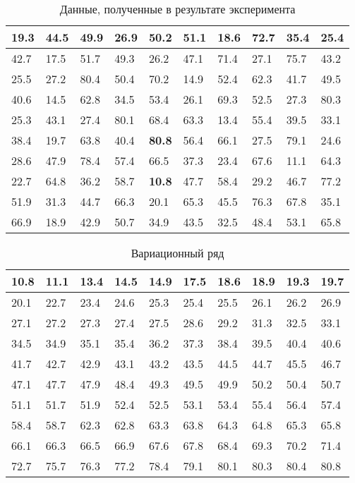 \documentclass{article}
\theoremstyle{problemstyle}
\begin{document}
\begin{table}[ht!]
  \centering
  \begin{tabular}{|l|l|l|l|l|l|l|l|l|l|}
    \hline
    19.3 & 44.5 & 49.9 & 26.9 & 50.2 & 51.1 & 18.6 & 72.7 & 35.4 & 25.4 \\
    \hline
    42.7 & 17.5 & 51.7 & 49.3 & 26.2 & 47.1 & 71.4 & 27.1 & 75.7 & 43.2 \\
    \hline
    25.5 & 27.2 & 80.4 & 50.4 & 70.2 & 14.9 & 52.4 & 62.3 & 41.7 & 49.5 \\ 
    \hline
    40.6 & 14.5 & 62.8 & 34.5 & 53.4 & 26.1 & 69.3 & 52.5 & 27.3 & 80.3 \\
    \hline
    25.3 & 43.1 & 27.4 & 80.1 & 68.4 & 63.3 & 13.4 & 55.4 & 39.5 & 33.1 \\ 
    \hline
    38.4 & 19.7 & 63.8 & 40.4 & \textbf{80.8} & 56.4 & 66.1 & 27.5 & 79.1 & 24.6 \\
    \hline
    28.6 & 47.9 & 78.4 & 57.4 & 66.5 & 37.3 & 23.4 & 67.6 & 11.1 & 64.3 \\
    \hline
    22.7 & 64.8 & 36.2 & 58.7 & \textbf{10.8} & 47.7 & 58.4 & 29.2 & 46.7 & 77.2 \\
    \hline
    51.9 & 31.3 & 44.7 & 66.3 & 20.1 & 65.3 & 45.5 & 76.3 & 67.8 & 35.1 \\
    \hline
    66.9 & 18.9 & 42.9 & 50.7 & 34.9 & 43.5 & 32.5 & 48.4 & 53.1 & 65.8 \\
    \hline
  \end{tabular}
  \caption{Данные, полученные в результате эксперимента}\label{table:data}
\end{table}

\begin{table}[ht!]
  \centering
  \begin{tabular}{|l|l|l|l|l|l|l|l|l|l|}
    \hline
    10.8 & 11.1 & 13.4 & 14.5 & 14.9 & 17.5 & 18.6 & 18.9 & 19.3 & 19.7 \\
    \hline
    20.1 & 22.7 & 23.4 & 24.6 & 25.3 & 25.4 & 25.5 & 26.1 & 26.2 & 26.9 \\
    \hline
    27.1 & 27.2 & 27.3 & 27.4 & 27.5 & 28.6 & 29.2 & 31.3 & 32.5 & 33.1 \\
    \hline
    34.5 & 34.9 & 35.1 & 35.4 & 36.2 & 37.3 & 38.4 & 39.5 & 40.4 & 40.6 \\
    \hline
    41.7 & 42.7 & 42.9 & 43.1 & 43.2 & 43.5 & 44.5 & 44.7 & 45.5 & 46.7 \\
    \hline
    47.1 & 47.7 & 47.9 & 48.4 & 49.3 & 49.5 & 49.9 & 50.2 & 50.4 & 50.7 \\
    \hline
    51.1 & 51.7 & 51.9 & 52.4 & 52.5 & 53.1 & 53.4 & 55.4 & 56.4 & 57.4 \\
    \hline
    58.4 & 58.7 & 62.3 & 62.8 & 63.3 & 63.8 & 64.3 & 64.8 & 65.3 & 65.8 \\
    \hline
    66.1 & 66.3 & 66.5 & 66.9 & 67.6 & 67.8 & 68.4 & 69.3 & 70.2 & 71.4 \\
    \hline
    72.7 & 75.7 & 76.3 & 77.2 & 78.4 & 79.1 & 80.1 & 80.3 & 80.4 & 80.8 \\
    \hline
  \end{tabular}
  \caption{Вариационный ряд}\label{table:var_series}
\end{table}
\end{document}
